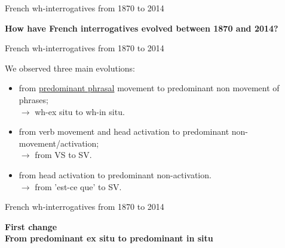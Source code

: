 \documentclass[lesson_slides]{subfiles}
\begin{document}
\begin{frame}[c]{French wh-interrogatives from 1870 to 2014}

    \begin{center}
        \textbf{How have French interrogatives evolved between 1870 and 2014?}
    \end{center}
  
\end{frame}
\begin{frame}[c]{French wh-interrogatives from 1870 to 2014}
    
        We observed three main evolutions: \pause 
        \begin{itemize}
            \item[\ding{227}] from \underline{predominant phrasal} movement to predominant non movement of phrases;\\ \pause $\longrightarrow$ wh-ex situ to wh-in situ. \pause
            \item[\ding{227}] from verb movement and head activation to predominant non-movement/activation;\\ \pause $\longrightarrow$ from VS to SV. \pause
            \item[\ding{227}] from head activation to predominant non-activation.\\ \pause $\longrightarrow$ from 'est-ce que' to SV.
        \end{itemize}
  
\end{frame}
\begin{frame}[c]{French wh-interrogatives from 1870 to 2014}
    
\begin{center}
    \textbf{First change\\From predominant ex situ to predominant in situ}
\end{center}
  
\end{frame}
\end{document}

